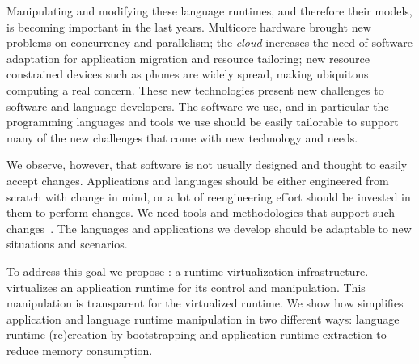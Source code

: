 Manipulating and modifying these language runtimes, and therefore their models, is becoming important in the last years. Multicore hardware brought new problems on concurrency and parallelism; the \emph{cloud} increases the need of software adaptation for application migration and resource tailoring; new resource constrained devices such as phones are widely spread, making ubiquitous computing a real concern. These new technologies present new challenges to software and language developers. The software we use, and in particular the programming languages and tools we use should be easily tailorable to support many of the new challenges that come with new technology and needs.

We observe, however, that software is not usually designed and thought to easily accept changes. Applications and languages should be either engineered from scratch with change in mind, or a lot of reengineering effort should be invested in them to perform changes. We need tools and methodologies that support such changes~\cite{Nier08b}. The languages and applications we develop should be adaptable to new situations and scenarios.

To address this goal we propose \emph{\Vtt}: a runtime virtualization infrastructure. \Vtt virtualizes an application runtime for its control and manipulation. This manipulation is transparent for the virtualized runtime. We show how \Vtt simplifies application and language runtime manipulation in two different ways: language runtime (re)creation by bootstrapping and application runtime extraction to reduce memory consumption.




